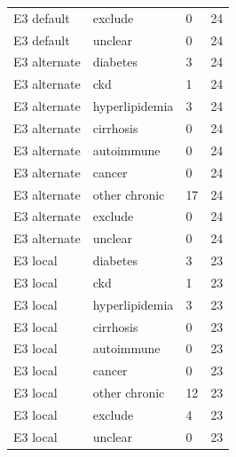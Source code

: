 \begin{longtable}{llll}
E3 default & exclude & 0 & 24 \\[3pt]
E3 default & unclear & 0 & 24 \\[3pt]
E3 alternate & diabetes & 3 & 24 \\[3pt]
E3 alternate & ckd & 1 & 24 \\[3pt]
E3 alternate & hyperlipidemia & 3 & 24 \\[3pt]
E3 alternate & cirrhosis & 0 & 24 \\[3pt]
E3 alternate & autoimmune & 0 & 24 \\[3pt]
E3 alternate & cancer & 0 & 24 \\[3pt]
E3 alternate & other chronic & 17 & 24 \\[3pt]
E3 alternate & exclude & 0 & 24 \\[3pt]
E3 alternate & unclear & 0 & 24 \\[3pt]
E3 local & diabetes & 3 & 23 \\[3pt]
E3 local & ckd & 1 & 23 \\[3pt]
E3 local & hyperlipidemia & 3 & 23 \\[3pt]
E3 local & cirrhosis & 0 & 23 \\[3pt]
E3 local & autoimmune & 0 & 23 \\[3pt]
E3 local & cancer & 0 & 23 \\[3pt]
E3 local & other chronic & 12 & 23 \\[3pt]
E3 local & exclude & 4 & 23 \\[3pt]
E3 local & unclear & 0 & 23 \\[3pt]
\hline
\end{longtable}
